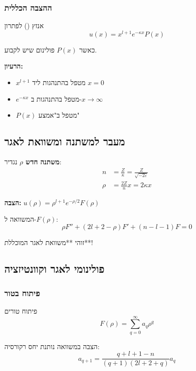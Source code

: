 \subsubsection{ההצבה הכללית}

\begin{importantbox}{אנזץ () לפתרון}
\[
u(x) = x^{l+1} e^{-\kappa x} P(x)
\]

כאשר $P(x)$ פולינום שיש לקבוע.

\textbf{הרעיון:}
\begin{itemize}
    \item $x^{l+1}$ מטפל בהתנהגות ליד $x=0$
    \item $e^{-\kappa x}$ מטפל בהתנהגות ב-$x \to \infty$
    \item $P(x)$ מטפל ב"אמצע"
\end{itemize}
\end{importantbox}

\subsection{מעבר למשתנה ומשוואת לאגר}

\textbf{משתנה חדש $\rho$}
נגדיר:
\begin{align*}
n &= \frac{Z}{\kappa} = \frac{Z}{\sqrt{-2\varepsilon}} \\
\rho &= \frac{2Z}{n}x = 2\kappa x
\end{align*}

\textbf{הצבה:} $u(\rho) = \rho^{l+1} e^{-\rho/2} F(\rho)$

המשוואה ל-$F(\rho)$:
\[
\rho F'' + (2l+2-\rho)F' + (n-l-1)F = 0
\]

זוהי **משוואת לאגר המוכללת**!


\subsection{פולינומי לאגר וקוונטיזציה}

\subsubsection{פיתוח בטור}

\begin{definitionbox}{פיתוח טורים}
\[
F(\rho) = \sum_{q=0}^\infty a_q \rho^q
\]

הצבה במשוואה נותנת יחס רקורסיה:
\[
a_{q+1} = \frac{q+l+1-n}{(q+1)(2l+2+q)} a_q
\]
\end{definitionbox}

